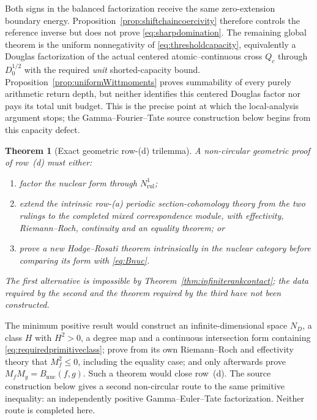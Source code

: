 \documentclass[11pt]{amsart}
\newtheorem{theorem}{Theorem}[section]
\theoremstyle{definition}
\theoremstyle{remark}
\begin{document}
Both signs in the balanced factorization receive the same zero-extension
boundary energy.  Proposition~\ref{prop:shiftchaincoercivity} therefore
controls the reference inverse but does not prove
\eqref{eq:sharpdomination}.  The remaining global theorem is the uniform
nonnegativity of \eqref{eq:thresholdcapacity}, equivalently a Douglas
factorization of the actual centered atomic--continuous cross \(Q_c\)
through \(D_0^{1/2}\) with the required \emph{unit} shorted-capacity bound.
Proposition~\ref{prop:uniformWittmoments} proves summability of every purely
arithmetic return depth, but neither identifies this centered Douglas
factor nor pays its total unit budget.  This is the precise point at which the local-analysis argument stops; the
Gamma--Fourier--Tate source construction below begins from this capacity
defect.



\begin{theorem}[Exact geometric row-(d) trilemma]
\label{thm:rowdtrilemma}
A non-circular geometric proof of row~(d) must either:
\begin{enumerate}
\item factor the nuclear form through $N^1_{\mathrm{rul}}$;
\item extend the intrinsic row-(a) periodic section-cohomology theory from the two rulings to the
completed mixed correspondence module, with effectivity, Riemann--Roch,
continuity and an equality theorem; or
\item prove a new Hodge--Rosati theorem intrinsically in the nuclear category
before comparing its form with \eqref{eq:Bnuc}.
\end{enumerate}
The first alternative is impossible by
Theorem~\ref{thm:infiniterankcontact}; the data required by the second and
the theorem required by the third have not been constructed.
\end{theorem}

The minimum positive result would construct an infinite-dimensional space
$N_D$, a class $H$ with $H^2>0$, a degree map and a continuous intersection
form containing \eqref{eq:requiredprimitiveclass}; prove from its own
Riemann--Roch and effectivity theory that $M_f^2\le0$, including the equality
case; and only afterwards prove $M_fM_g=B_{\mathrm{nuc}}(f,g)$.  Such a theorem would close row~(d).  The source construction below gives a
second non-circular route to the same primitive inequality: an independently
positive Gamma--Euler--Tate factorization.  Neither route is completed here.
\end{document}
